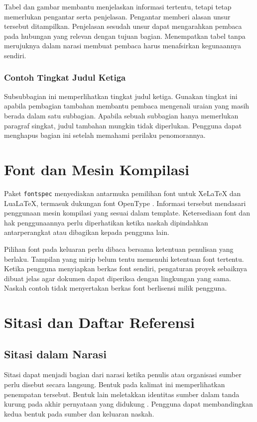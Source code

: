 Tabel dan gambar membantu menjelaskan informasi tertentu, tetapi tetap memerlukan pengantar serta penjelasan. Pengantar memberi alasan unsur tersebut ditampilkan. Penjelasan sesudah unsur dapat mengarahkan pembaca pada hubungan yang relevan dengan tujuan bagian. Menempatkan tabel tanpa merujuknya dalam narasi membuat pembaca harus menafsirkan kegunaannya sendiri.

\subsubsection{Contoh Tingkat Judul Ketiga}

Subsubbagian ini memperlihatkan tingkat judul ketiga. Gunakan tingkat ini apabila pembagian tambahan membantu pembaca mengenali uraian yang masih berada dalam satu subbagian. Apabila sebuah subbagian hanya memerlukan paragraf singkat, judul tambahan mungkin tidak diperlukan. Pengguna dapat menghapus bagian ini setelah memahami perilaku penomorannya.

\section{Font dan Mesin Kompilasi}

Paket \texttt{fontspec} menyediakan antarmuka pemilihan font untuk XeLaTeX dan LuaLaTeX, termasuk dukungan font OpenType \parencite{ctan-fontspec}. Informasi tersebut mendasari penggunaan mesin kompilasi yang sesuai dalam template. Ketersediaan font dan hak penggunaannya perlu diperhatikan ketika naskah dipindahkan antarperangkat atau dibagikan kepada pengguna lain.

Pilihan font pada keluaran perlu dibaca bersama ketentuan penulisan yang berlaku. Tampilan yang mirip belum tentu memenuhi ketentuan font tertentu. Ketika pengguna menyiapkan berkas font sendiri, pengaturan proyek sebaiknya dibuat jelas agar dokumen dapat diperiksa dengan lingkungan yang sama. Naskah contoh tidak menyertakan berkas font berlisensi milik pengguna.

\section{Sitasi dan Daftar Referensi}

\subsection{Sitasi dalam Narasi}

Sitasi dapat menjadi bagian dari narasi ketika penulis atau organisasi sumber perlu disebut secara langsung. Bentuk \textcite{ctan-biblatex} pada kalimat ini memperlihatkan penempatan tersebut. Bentuk lain meletakkan identitas sumber dalam tanda kurung pada akhir pernyataan yang didukung \parencite{ctan-biblatex}. Pengguna dapat membandingkan kedua bentuk pada sumber dan keluaran naskah.

